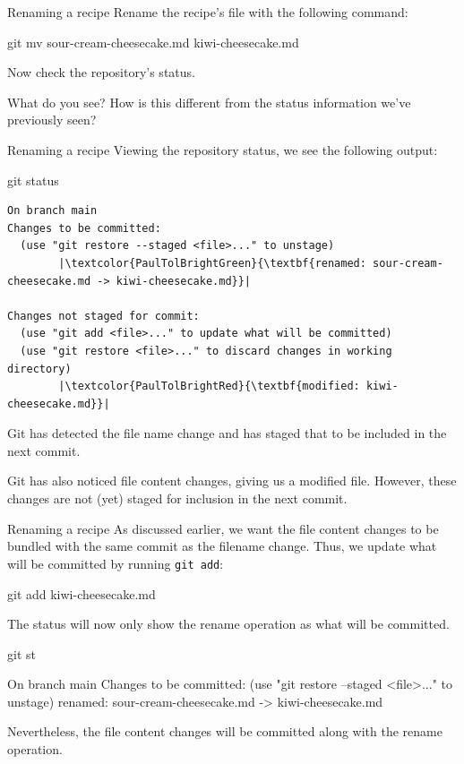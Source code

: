 \documentclass{git_course}
\begin{document}
\begin{frame}[fragile]{Renaming a recipe}
    Rename the recipe's file with the following command:
    \begin{shellcode}
        git mv sour-cream-cheesecake.md kiwi-cheesecake.md
    \end{shellcode}

    Now check the repository's status.

    What do you see?  How is this different from the status information
    we've previously seen?
\end{frame}

\begin{frame}[fragile]{Renaming a recipe}
    Viewing the repository status, we see the following output:
    \begin{shellcode}
        git status
    \end{shellcode}
    \begin{verbatim}
On branch main
Changes to be committed:
  (use "git restore --staged <file>..." to unstage)
        |\textcolor{PaulTolBrightGreen}{\textbf{renamed: sour-cream-cheesecake.md -> kiwi-cheesecake.md}}|

Changes not staged for commit:
  (use "git add <file>..." to update what will be committed)
  (use "git restore <file>..." to discard changes in working directory)
        |\textcolor{PaulTolBrightRed}{\textbf{modified: kiwi-cheesecake.md}}|
    \end{verbatim}

    Git has detected the file name change and has staged that to be included
    in the next commit.

    Git has also noticed file content changes, giving us a modified file.
    However, these changes are not (yet) staged for inclusion in the next
    commit.
\end{frame}

\begin{frame}[fragile]{Renaming a recipe}
    As discussed earlier, we want the file content changes to be bundled
    with the same commit as the filename change.  Thus, we update what will
    be committed by running \texttt{git add}:

    \begin{shellcode}
        git add kiwi-cheesecake.md
    \end{shellcode}

    The status will now only show the rename operation as what will be
    committed.
    \begin{shellcode}
        git st
    \end{shellcode}
    \begin{outputcode}
On branch main
Changes to be committed:
  (use "git restore --staged <file>..." to unstage)
        renamed:    sour-cream-cheesecake.md -> kiwi-cheesecake.md
    \end{outputcode}

    Nevertheless, the file content changes will be committed along with the
    rename operation.
\end{frame}
\end{document}
